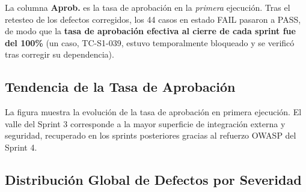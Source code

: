\begin{NotaTecnica}
La columna \textbf{Aprob.} es la tasa de aprobación en la \textit{primera} ejecución. Tras
el retesteo de los defectos corregidos, los 44 casos en estado FAIL pasaron a PASS, de modo
que la \textbf{tasa de aprobación efectiva al cierre de cada sprint fue del 100\%} (un caso,
TC-S1-039, estuvo temporalmente bloqueado y se verificó tras corregir su dependencia).
\end{NotaTecnica}

\subsection{Tendencia de la Tasa de Aprobación}

La figura muestra la evolución de la tasa de aprobación en primera ejecución. El valle del
Sprint 3 corresponde a la mayor superficie de integración externa y seguridad, recuperado
en los sprints posteriores gracias al refuerzo OWASP del Sprint 4.

\begin{center}
\end{center}

\clearpage
\subsection{Distribución Global de Defectos por Severidad}

